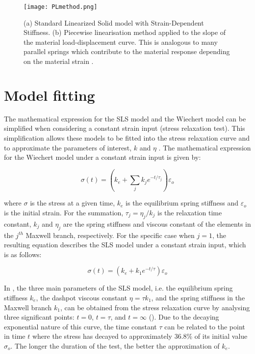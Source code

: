 \begin{figure}[htb!]
	\centering
    \texttt{[image: PLmethod.png]}
    \caption[(a) Standard Linearized Solid model with Strain-Dependent Stiffness. (b) Piecewise linearisation method applied to the slope of the material load-displacement curve. This is analogous to many parallel springs which contribute to the material response depending on the material strain.]{(a) Standard Linearized Solid model with Strain-Dependent Stiffness. (b) Piecewise linearisation method applied to the slope of the material load-displacement curve. This is analogous to many parallel springs which contribute to the material response depending on the material strain \cite{austin2015control}.}
    \label{fig:PLmethod}
\end{figure}

\section{Model fitting} \label{sec:Modelfit}

The mathematical expression for the SLS model and the Wiechert model can be simplified when considering a constant strain input (stress relaxation test). This simplification allows these models to be fitted into the stress relaxation curve and to approximate the parameters of interest, $k$ and $\eta$ \cite{roylance2001engineering}. The mathematical expression for the Wiechert model under a constant strain input is given by:

\begin{equation}
\label{eq1}
\sigma (t) = \left( k_e +  \sum_{j} k_j e^{-t/\tau_j} \right)  \varepsilon_o
\end{equation}

\noindent where $\sigma$ is the stress at a given time, $k_e$ is the equilibrium spring stiffness and $\varepsilon_o$ is the initial strain. For the summation, $\tau_j=\eta_j/k_j$ is the relaxation time constant, $k_j$ and $\eta_j$ are the spring stiffness and viscous constant of the elements in the $j^{th}$ Maxwell branch, respectively. For the specific case when $j = 1$, the resulting equation describes the SLS model under a constant strain input, which is as follows:

\begin{equation}
\label{eq11}
\sigma(t) = \left( k_e +  k_1 e^{-t/\tau} \right)  \varepsilon_o
\end{equation}


In , the three main parameters of the SLS model, i.e. the equilibrium spring stiffness $k_e$, the dashpot viscous constant $\eta = \tau k_1$, and the spring stiffness in the Maxwell branch $k_1$, can be obtained from the stress relaxation curve by analysing three significant points: $t=0$, $t=\tau$, and $t=\infty$ (). Due to the decaying exponential nature of this curve, the time constant $\tau$ can be related to the point in time $t$ where the stress has decayed to approximately 36.8\% of its initial value $\sigma_o$. The longer the duration of the test, the better the approximation of $k_e$.

